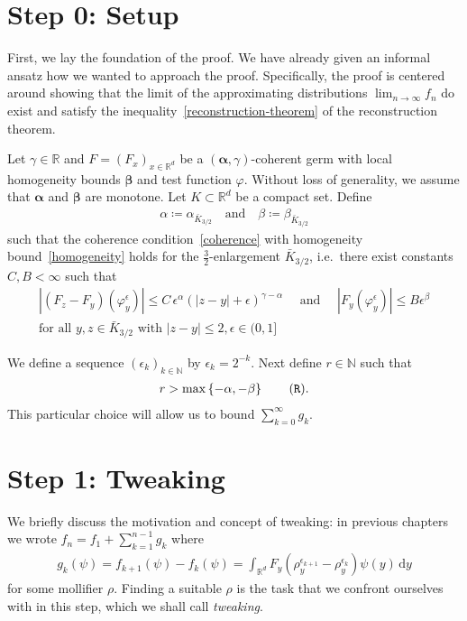\section{Step 0: Setup}\label{setup} First, we lay the foundation of the proof. We have already given an informal ansatz how we wanted to approach the proof. Specifically, the proof is centered around showing that the limit of the approximating distributions \(\lim_{n \to \infty} f_n\) do exist and satisfy the inequality~\eqref{reconstruction-theorem} of the reconstruction theorem.

Let \(\gamma \in \mathbb{R}\) and \(F = (F_x)_{x \in \mathbb{R}^d}\) be a \((\bm \alpha, \gamma)\)-coherent germ with local homogeneity bounds \(\bm \beta\) and test function \(\varphi\). Without loss of generality, we assume that \(\bm \alpha\) and \(\bm \beta\) are monotone. Let \(K \subset \mathbb{R}^d\) be a compact set. Define 
\begin{align*}
    \alpha \coloneqq \alpha_{\bar K_{3/2}} \quad \text{and} \quad  \beta \coloneqq \beta_{\bar K_{3/2}}
\end{align*}
 such that the coherence condition~\eqref{coherence} with homogeneity bound~\eqref{homogeneity} holds for the \(\frac{3}{2}\)-enlargement \(\bar K_{3/2}\), i.e.\ there exist constants \(C,B < \infty\) such that
\begin{gather}\label{starter-coherence}
    |(F_z - F_y)(\varphi^\epsilon_y)| \leq C \, \epsilon^\alpha(|z-y| + \epsilon)^{\gamma - \alpha} \quad \text{ and } \quad
    |F_y(\varphi^\epsilon_y)| \leq B \epsilon^\beta \\
    \text{for all } y,z \in \bar K_{3/2} \text{ with } |z-y| \leq 2,  \epsilon \in (0,1] \nonumber
\end{gather}

We define a sequence \((\epsilon_k)_{k \in \mathbb{N}}\) by \(\epsilon_k = 2^{-k}\). Next define \(r \in \mathbb{N}\) such that
\begin{align}\label{setup:r}
    r > \max\left\{ -\alpha, -\beta \right\} \tag{\texttt{R}}.
\end{align}
This particular choice will allow us to bound \(\sum^\infty_{k=0} g_k\). 

\section{Step 1: Tweaking}\label{chapter:step-1-tweaking}

We briefly discuss the motivation and concept of tweaking: in previous chapters we wrote \(f_n = f_1 + \sum^{n-1}_{k=1}g_k\) where
\begin{align*}
    g_k(\psi) = f_{k+1}(\psi) - f_k(\psi) = \int_{\mathbb{R}^d} F_y(\rho_y^{\epsilon_{k+1}} - \rho_y^{\epsilon_k}) \psi(y)\, \mathrm{d}y
\end{align*} 
for some mollifier \(\rho\). Finding a suitable \(\rho\) is the task that we confront ourselves with in this step, which we shall call \emph{tweaking}. 

